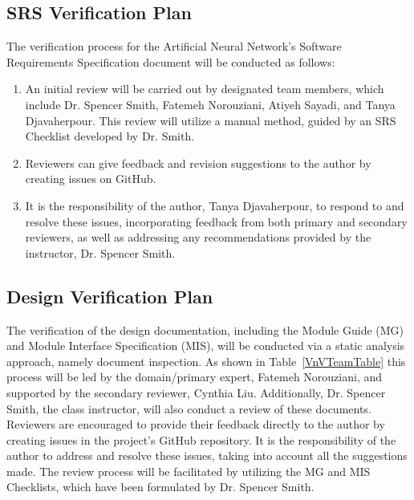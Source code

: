 \documentclass[12pt, titlepage]{article}
\begin{document}

\subsection{SRS Verification Plan}\label{SRSVerPlan}

The verification process for the Artificial Neural Network's Software Requirements Specification 
document will be conducted as follows:

\begin{enumerate}
  \item An initial review will be carried out by designated team members, which include Dr. 
    Spencer Smith, Fatemeh Norouziani, Atiyeh Sayadi, and Tanya Djavaherpour. 
    This review will utilize a manual method, guided by an 
    SRS Checklist \citep{SRS-Checklist} developed by Dr. Smith.
  \item Reviewers can give feedback and revision suggestions to the author by creating issues on GitHub.
  \item It is the responsibility of the author, Tanya Djavaherpour, to respond to and 
  resolve these issues, incorporating feedback from both primary and secondary reviewers, 
  as well as addressing any recommendations provided by the instructor, Dr. Spencer Smith.
\end{enumerate}



\subsection{Design Verification Plan}\label{DesignVerPlan}

The verification of the design documentation, including the Module Guide (MG) 
and Module Interface Specification (MIS), will be conducted via a static 
analysis approach, namely document inspection. As shown in Table~\ref{VnVTeamTable}
this process will be led by 
the domain/primary expert, Fatemeh Norouziani, and supported by the secondary 
reviewer, Cynthia Liu. Additionally, Dr. Spencer Smith, the class instructor, 
will also conduct a review of these documents. Reviewers are encouraged to 
provide their feedback directly to the author by creating issues in the 
project's GitHub repository. It is the responsibility of the author to 
address and resolve these issues, taking into account all the suggestions 
made. The review process will be facilitated by utilizing the 
MG \citep{MG-Checklist} and MIS \citep{MIS-checklist} 
Checklists, which have been formulated by Dr. Spencer Smith.
\end{document}

